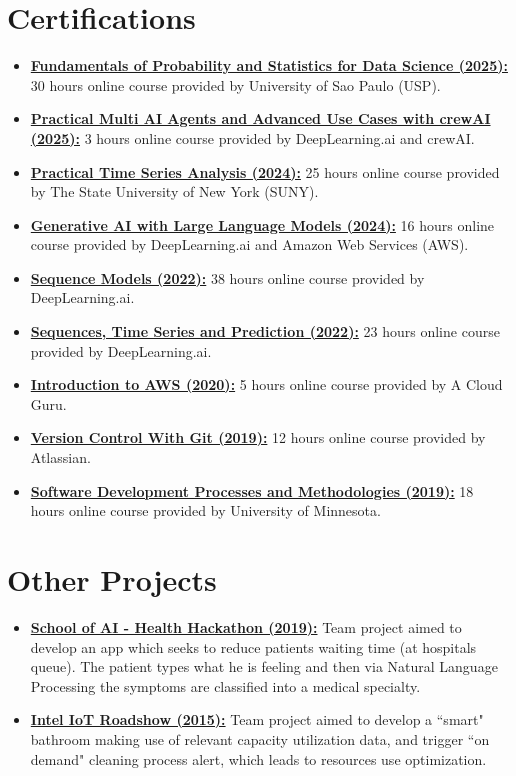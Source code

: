 \documentclass[letterpaper,6pt]{article}
\newcommand{\resumeItem}[2]{
  \item\small{
    \textbf{#1}{ #2 \vspace{-2pt}}
  }
}
\newcommand{\resumeSubItem}[2]{\resumeItem{#1}{#2}\vspace{-4pt}}
\newcommand{\resumeSubHeadingListStart}{\begin{itemize}[leftmargin=*]}
\newcommand{\resumeSubHeadingListEnd}{\end{itemize}}
\begin{document}
\section{Certifications}
  \resumeSubHeadingListStart
    \resumeItem{\href{https://drive.google.com/file/d/1EjtbiZu-XFjj7U9qLQ-m4WcRyUz0_eDk/view?usp=sharing}{Fundamentals of Probability and Statistics for Data Science (2025):}}{30 hours online course provided by University of Sao Paulo (USP).}
    \resumeItem{\href{https://learn.deeplearning.ai/accomplishments/3db9d146-093c-4dea-bb10-35f1f4fcf390?usp=sharing}{Practical Multi AI Agents and Advanced Use Cases with crewAI (2025):}}{3 hours online course provided by DeepLearning.ai and crewAI.}
    \resumeItem{\href{https://coursera.org/share/236b7e6ee1cd2fe7d370d22032c9829b}{Practical Time Series Analysis (2024):}}{25 hours online course provided by The State University of New York (SUNY).}
    \resumeItem{\href{https://coursera.org/share/2c0b8bc9c80337baff021341eb7291f6}{Generative AI with Large Language Models (2024):}}{16 hours online course provided by DeepLearning.ai and Amazon Web Services (AWS).}
    \resumeItem{\href{https://coursera.org/share/bfeeaa2fdb5d0af4a6ae16bbea2308a5}{Sequence Models (2022):}}{38 hours online course provided by DeepLearning.ai.}
    \resumeItem{\href{https://coursera.org/share/26abd334d3e6eeb10cdef24a925c1a06}{Sequences, Time Series and Prediction (2022):}}{23 hours online course provided by DeepLearning.ai.}
    \resumeItem{\href{https://verify.acloud.guru/40ACAB21F4F9}{Introduction to AWS (2020):}}{5 hours online course provided by A Cloud Guru.}
    \resumeItem{\href{https://coursera.org/share/0f7a200acafda161712761aabc647fdf}{Version Control With Git (2019):}}{12 hours online course provided by Atlassian.}
    \resumeItem{\href{https://coursera.org/share/49e36f73ee5af2e58a65943a26848b88}{Software Development Processes and Methodologies (2019):}}{18 hours online course provided by University of Minnesota.}
  \resumeSubHeadingListEnd

\section{Other Projects}
  \resumeSubHeadingListStart
    \resumeSubItem{\href{https://github.com/bzamith/ID_Agile-HH}{School of AI - Health Hackathon (2019):}}{Team project aimed to develop an app which seeks to reduce patients waiting time (at hospitals queue). The patient types what he is feeling and then via Natural Language Processing the symptoms are classified into a medical specialty. }
    \resumeSubItem{\href{http://www.instructables.com/id/IoT-Smart-Bathroom/}{Intel IoT Roadshow (2015):}}{Team project aimed to develop a ``smart" bathroom making use of relevant capacity utilization data, and trigger ``on demand" cleaning process alert, which leads to resources use optimization.}
  \resumeSubHeadingListEnd
\end{document}
